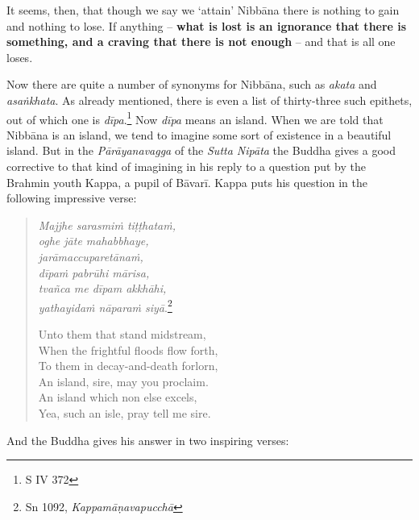 It seems, then, that though we say we `attain' Nibbāna there is nothing to gain and nothing to lose. If anything -- \textbf{what is lost is an ignorance that there is something, and a craving that there is not enough} -- and that is all one loses.

Now there are quite a number of synonyms for Nibbāna, such as \emph{akata} and \emph{asaṅkhata}. As already mentioned, there is even a list of thirty-three such epithets, out of which one is \emph{dīpa}.\footnote{S IV 372} Now \emph{dīpa} means an island. When we are told that Nibbāna is an island, we tend to imagine some sort of existence in a beautiful island. But in the \emph{Pārāyanavagga} of the \emph{Sutta Nipāta} the Buddha gives a good corrective to that kind of imagining in his reply to a question put by the Brahmin youth Kappa, a pupil of Bāvarī. Kappa puts his question in the following impressive verse:

\begin{quote}
\emph{Majjhe sarasmiṁ tiṭṭhataṁ,}\\
\emph{oghe jāte mahabbhaye,}\\
\emph{jarāmaccuparetānaṁ,}\\
\emph{dīpaṁ pabrūhi mārisa,}\\
\emph{tvañca me dīpam akkhāhi,}\\
\emph{yathayidaṁ nāparaṁ siyā}.\footnote{Sn 1092, \emph{Kappamāṇavapucchā}}

Unto them that stand midstream,\\
When the frightful floods flow forth,\\
To them in decay-and-death forlorn,\\
An island, sire, may you proclaim.\\
An island which non else excels,\\
Yea, such an isle, pray tell me sire.
\end{quote}

And the Buddha gives his answer in two inspiring verses:

\enlargethispage{\baselineskip}

